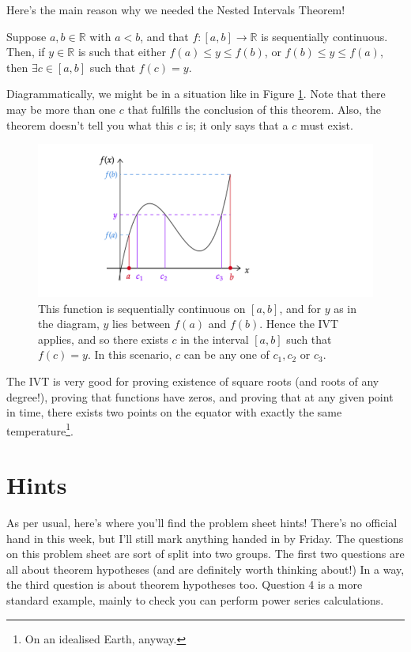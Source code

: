 \documentclass[
  17pt,
  a4paper]{extarticle}
\theoremstyle{plain}
\theoremstyle{plain}
\theoremstyle{plain}
\theoremstyle{plain}
\theoremstyle{plain}
\theoremstyle{definition}
\theoremstyle{definition}
\theoremstyle{definition}
\theoremstyle{remark}
\let\BeginKnitrBlock\begin \let\EndKnitrBlock\end
\renewcommand{\;}{\,}
\begin{document}
Here's the main reason why we needed the Nested Intervals Theorem!

\BeginKnitrBlock{theorem}[Intermediate Value Theorem (IVT)]
{\label{thm:thm2} }Suppose \(a,b \in \mathbb{R}\) with \(a < b\), and that \(f:[a,b] \to \mathbb{R}\) is sequentially continuous. Then, if \(y \in \mathbb{R}\) is such that either \(f(a) \leq y \leq f(b)\), or \(f(b) \leq y \leq f(a)\), then \(\exists c \in [a,b]\) such that \(f(c) = y\).
\EndKnitrBlock{theorem}
Diagrammatically, we might be in a situation like in Figure \ref{fig:ivt}. Note that there may be more than one \(c\) that fulfills the conclusion of this theorem. Also, the theorem doesn't tell you what this \(c\) is; it only says that a \(c\) must exist.

\begin{figure}
\includegraphics[width=\Width,height=\Height]{ivt} \caption{This function is sequentially continuous on $[a,b]$, and for $y$ as in the diagram, $y$ lies between $f(a)$ and $f(b)$. Hence the IVT applies, and so there exists $c$ in the interval $[a,b]$ such that $f(c)=y$. In this scenario, $c$ can be any one of $c_1,c_2$ or $c_3$.}\label{fig:ivt}
\end{figure}

The IVT is very good for proving existence of square roots (and roots of any degree!), proving that functions have zeros, and proving that at any given point in time, there exists two points on the equator with exactly the same temperature\footnote{On an idealised Earth, anyway.}.

\hypertarget{hints}{%
\section{Hints}\label{hints}}

As per usual, here's where you'll find the problem sheet hints! There's no official hand in this week, but I'll still mark anything handed in by Friday. The questions on this problem sheet are sort of split into two groups. The first two questions are all about theorem hypotheses (and are definitely worth thinking about!) In a way, the third question is about theorem hypotheses too. Question 4 is a more standard example, mainly to check you can perform power series calculations.
\end{document}
